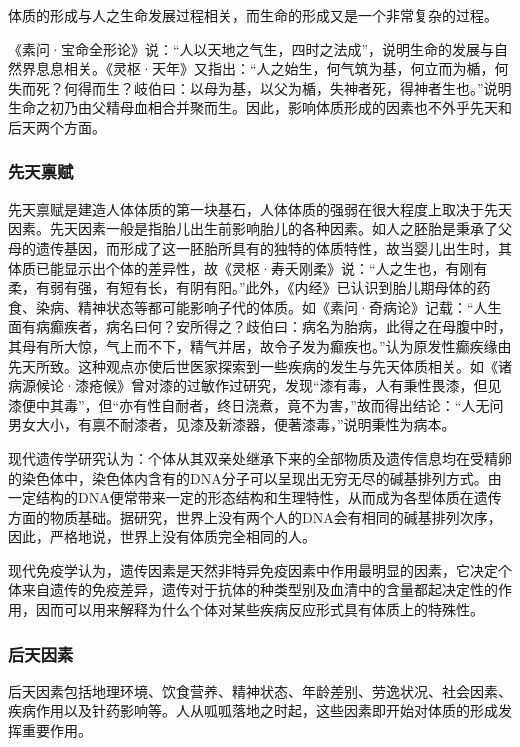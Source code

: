 \documentclass[draft,12pt]{ctexbook}
\begin{document}
体质的形成与人之生命发展过程相关，而生命的形成又是一个非常复杂的过程。

《素问·宝命全形论》说：“人以天地之气生，四时之法成”，说明生命的发展与自然界息息相关。《灵枢·天年》又指出：“人之始生，何气筑为基，何立而为楯，何失而死？何得而生？岐伯曰：以母为基，以父为楯，失神者死，得神者生也。”说明生命之初乃由父精母血相合并聚而生。因此，影响体质形成的因素也不外乎先天和后天两个方面。

\subsubsection{先天禀赋}%

先天禀赋是建造人体体质的第一块基石，人体体质的强弱在很大程度上取决于先天因素。先天因素一般是指胎儿出生前影响胎儿的各种因素。如人之胚胎是秉承了父母的遗传基因，而形成了这一胚胎所具有的独特的体质特性，故当婴儿出生时，其体质已能显示出个体的差异性，故《灵枢·寿夭刚柔》说：“人之生也，有刚有柔，有弱有强，有短有长，有阴有阳。”此外，《内经》已认识到胎儿期母体的药食、染病、精神状态等都可能影响子代的体质。如《素问·奇病论》记载：“人生面有病癫疾者，病名曰何？安所得之？歧伯曰：病名为胎病，此得之在母腹中时，其母有所大惊，气上而不下，精气并居，故令子发为癫疾也。”认为原发性癫疾缘由先天所致。这种观点亦使后世医家探索到一些疾病的发生与先天体质相关。如《诸病源候论·漆疮候》曾对漆的过敏作过研究，发现“漆有毒，人有秉性畏漆，但见漆便中其毒”，但“亦有性自耐者，终日浇煮，竟不为害，”故而得出结论：“人无问男女大小，有禀不耐漆者，见漆及新漆器，便著漆毒，”说明秉性为病本。

现代遗传学研究认为：个体从其双亲处继承下来的全部物质及遗传信息均在受精卵的染色体中，染色体内含有的DNA分子可以呈现出无穷无尽的碱基排列方式。由一定结构的DNA便常带来一定的形态结构和生理特性，从而成为各型体质在遗传方面的物质基础。据研究，世界上没有两个人的DNA会有相同的碱基排列次序，因此，严格地说，世界上没有体质完全相同的人。

现代免疫学认为，遗传因素是天然非特异免疫因素中作用最明显的因素，它决定个体来自遗传的免疫差异，遗传对于抗体的种类型别及血清中的含量都起决定性的作用，因而可以用来解释为什么个体对某些疾病反应形式具有体质上的特殊性。

\subsubsection{后天因素}%

后天因素包括地理环境、饮食营养、精神状态、年龄差别、劳逸状况、社会因素、疾病作用以及针药影响等。人从呱呱落地之时起，这些因素即开始对体质的形成发挥重要作用。
\end{document}
